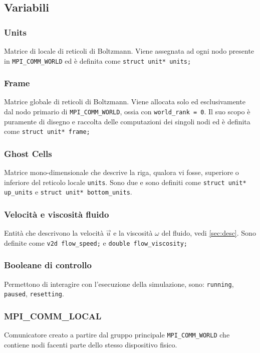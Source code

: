 \documentclass[12pt]{article}
\begin{document}
\subsection{Variabili}

\subsubsection{Units}
Matrice di locale di reticoli di Boltzmann. Viene assegnata ad ogni nodo presente in \verb|MPI_COMM_WORLD| ed è definita come \verb|struct unit* units;|

\subsubsection{Frame}
Matrice globale di reticoli di Boltzmann. Viene allocata solo ed esclusivamente dal nodo primario di \verb|MPI_COMM_WORLD|, ossia con \verb|world_rank = 0|. Il suo scopo è puramente di disegno e raccolta delle computazioni dei singoli nodi ed è definita come \verb|struct unit* frame;|

\subsubsection{Ghost Cells}
Matrice mono-dimensionale che descrive la riga, qualora vi fosse, superiore o inferiore del reticolo locale \verb|units|. Sono due e sono definiti come \verb|struct unit* up_units| e \verb|struct unit* bottom_units|.

\subsubsection{Velocità e viscosità fluido}
Entità che descrivono la velocità \(\vec{u}\) e la viscosità \(\omega\) del fluido, vedi \ref{sec:desc}.
Sono definite come \verb|v2d flow_speed;| e \verb|double flow_viscosity;|

\subsubsection{Booleane di controllo}
Permettono di interagire con l'esecuzione della simulazione, sono: \verb|running|, \verb|paused|, \verb|resetting|.


\subsubsection{MPI\_COMM\_LOCAL}
Comunicatore creato a partire dal gruppo principale \verb|MPI_COMM_WORLD| che contiene nodi facenti parte dello stesso dispositivo fisico.
\end{document}
